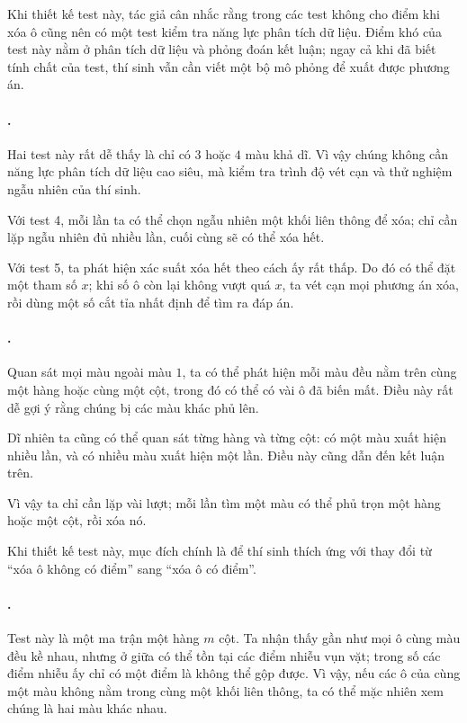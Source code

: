 \documentclass[11pt]{article}
\begin{document}
Khi thiết kế test này, tác giả cân nhắc rằng trong các test không cho điểm khi
xóa ô cũng nên có một test kiểm tra năng lực phân tích dữ liệu. Điểm khó của
test này nằm ở phân tích dữ liệu và phỏng đoán kết luận; ngay cả khi đã biết
tính chất của test, thí sinh vẫn cần viết một bộ mô phỏng để xuất được phương
án.

\paragraph{.}
Hai test này rất dễ thấy là chỉ có \(3\) hoặc \(4\) màu khả dĩ. Vì vậy chúng
không cần năng lực phân tích dữ liệu cao siêu, mà kiểm tra trình độ vét cạn và
thử nghiệm ngẫu nhiên của thí sinh.

Với test 4, mỗi lần ta có thể chọn ngẫu nhiên một khối liên thông để xóa; chỉ
cần lặp ngẫu nhiên đủ nhiều lần, cuối cùng sẽ có thể xóa hết.

Với test 5, ta phát hiện xác suất xóa hết theo cách ấy rất thấp. Do đó có thể
đặt một tham số \(x\); khi số ô còn lại không vượt quá \(x\), ta vét cạn mọi
phương án xóa, rồi dùng một số cắt tỉa nhất định để tìm ra đáp án.

\paragraph{.}
Quan sát mọi màu ngoài màu \(1\), ta có thể phát hiện mỗi màu đều nằm trên
cùng một hàng hoặc cùng một cột, trong đó có thể có vài ô đã biến mất. Điều
này rất dễ gợi ý rằng chúng bị các màu khác phủ lên.

Dĩ nhiên ta cũng có thể quan sát từng hàng và từng cột: có một màu xuất hiện
nhiều lần, và có nhiều màu xuất hiện một lần. Điều này cũng dẫn đến kết luận
trên.

Vì vậy ta chỉ cần lặp vài lượt; mỗi lần tìm một màu có thể phủ trọn một hàng
hoặc một cột, rồi xóa nó.

Khi thiết kế test này, mục đích chính là để thí sinh thích ứng với thay đổi từ
``xóa ô không có điểm'' sang ``xóa ô có điểm''.

\paragraph{.}
Test này là một ma trận một hàng \(m\) cột. Ta nhận thấy gần như mọi ô cùng
màu đều kề nhau, nhưng ở giữa có thể tồn tại các điểm nhiễu vụn vặt; trong số
các điểm nhiễu ấy chỉ có một điểm là không thể gộp được. Vì vậy, nếu các ô của
cùng một màu không nằm trong cùng một khối liên thông, ta có thể mặc nhiên xem
chúng là hai màu khác nhau.
\end{document}
